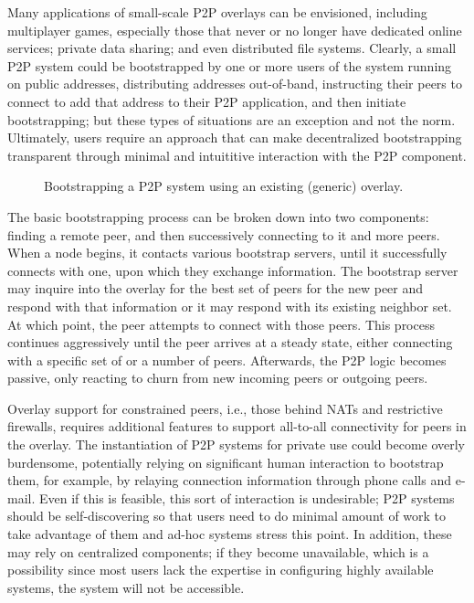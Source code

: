 \documentclass[conference]{IEEEtran}
\begin{document}
Many applications of small-scale P2P overlays can be envisioned, including
multiplayer games, especially those that never or no longer have dedicated
online services; private data sharing; and even distributed file systems.
Clearly, a small P2P system could be bootstrapped by one or more users of the
system running on public addresses, distributing addresses out-of-band,
instructing their peers to connect to add that address to their P2P
application, and then initiate bootstrapping; but these types of situations are
an exception and not the norm.  Ultimately, users require an approach that can
make decentralized bootstrapping transparent through minimal and intuititive
interaction with the P2P component.

\begin{figure*}[h!t!]
\centering
{}
\caption{Bootstrapping a P2P system using an existing (generic) overlay.}
\label{fig:bootstrap}
\end{figure*}

The basic bootstrapping process can be broken down into two components: finding
a remote peer, and then successively connecting to it and more peers.  When a
node begins, it contacts various bootstrap servers, until it successfully
connects with one, upon which they exchange information.  The bootstrap server
may inquire into the overlay for the best set of peers for the new peer and
respond with that information or it may respond with its existing neighbor set.
At which point, the peer attempts to connect with those peers.  This process
continues aggressively until the peer arrives at a steady state, either
connecting with a specific set of or a number of peers.  Afterwards, the P2P logic
becomes passive, only reacting to churn from new incoming peers or outgoing
peers.

Overlay support for constrained peers, i.e., those behind NATs and restrictive
firewalls, requires additional features to support all-to-all connectivity for
peers in the overlay.  The instantiation of P2P systems for private use could
become overly burdensome, potentially relying on significant human interaction
to bootstrap them, for example, by relaying connection information through
phone calls and e-mail.  Even if this is feasible, this sort of interaction is
undesirable; P2P systems should be self-discovering so that users need to do
minimal amount of work to take advantage of them and ad-hoc systems stress this
point.  In addition, these may rely on centralized components; if they become
unavailable, which is a possibility since most users lack the expertise in
configuring highly available systems, the system will not be accessible.
\end{document}

